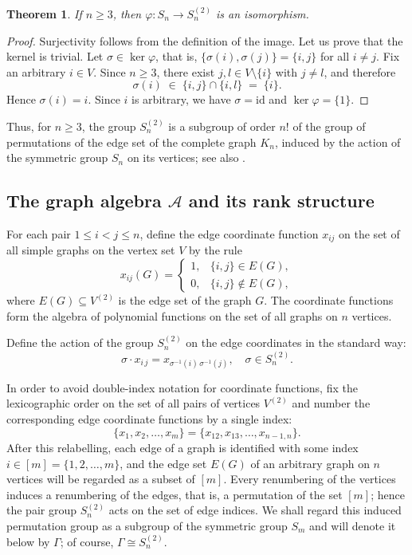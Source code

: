 \documentclass[12pt,reqno]{amsart}
\newtheorem{theorem}{Theorem}[section]
\begin{document}
\begin{theorem}\label{phi_iso}
  If $n \ge 3$, then $\varphi : S_n \longrightarrow  S_n^{(2)}$ is an
  isomorphism.
\end{theorem}

\begin{proof}
  Surjectivity follows from the definition of the image.
  Let us prove that the kernel is trivial.
  Let $\sigma \in \ker\varphi$, that is,
  $\{\sigma(i),\sigma(j)\} = \{i,j\}$ for all $i \ne j$.
  Fix an arbitrary $i \in V$.
  Since $n \ge 3$, there exist $j, l \in V\setminus\{i\}$ with $j \ne l$,
  and therefore
  $$
    \sigma(i) \;\in\; \{i,j\} \cap \{i,l\} \;=\; \{i\}.
  $$
  Hence $\sigma(i)=i$.
  Since $i$ is arbitrary, we have $\sigma=\mathrm{id}$ and
  $\ker\varphi=\{1\}$.
\end{proof}

Thus, for $n\ge 3$, the group $S_n^{(2)}$ is a subgroup of order $n!$ of the
group of permutations of the edge set of the complete graph $K_n$, induced by
the action of the symmetric group $S_n$ on its vertices; see also
\cite[Chapter~4]{H-P}.


\subsection{The graph algebra $\mathcal A$ and its rank structure}


For each pair $1\le i<j\le n$, define the edge coordinate function $x_{ij}$
on the set of all simple graphs on the vertex set $V$ by the rule
$$
x_{ij}(G)=
\begin{cases}
1,& \{i,j\}\in E(G),\\
0,& \{i,j\}\notin E(G),
\end{cases}
$$
where $E(G)\subseteq V^{(2)}$ is the edge set of the graph $G$.
The coordinate functions form the algebra of polynomial functions on the set
of all graphs on $n$ vertices.

Define the action of the group $S_n^{(2)}$ on the edge coordinates in the
standard way:
$$
\sigma \cdot x_{i\,j} = x_{\sigma^{-1}(i)\,\sigma^{-1}(j)}, \quad \sigma \in S_n^{(2)}.
$$

In order to avoid double-index notation for coordinate functions, fix the
lexicographic order on the set of all pairs of vertices $V^{(2)}$ and number
the corresponding edge coordinate functions by a single index:
$$
\{x_1,x_2,\ldots,x_m\}=\{x_{12},x_{13},\ldots,x_{n-1,n}\}.
$$
After this relabelling, each edge of a graph is identified with some index
$i\in [m]=\{1,2,\ldots,m\}$, and the edge set $E(G)$ of an arbitrary graph
on $n$ vertices will be regarded as a subset of $[m]$.
Every renumbering of the vertices induces a renumbering of the edges, that is,
a permutation of the set $[m]$; hence the pair group $S_n^{(2)}$ acts on the
set of edge indices.
We shall regard this induced permutation group as a subgroup of the symmetric
group $S_m$ and will denote it below by $\Gamma$; of course,
$\Gamma\cong S_n^{(2)}$.
\end{document}
